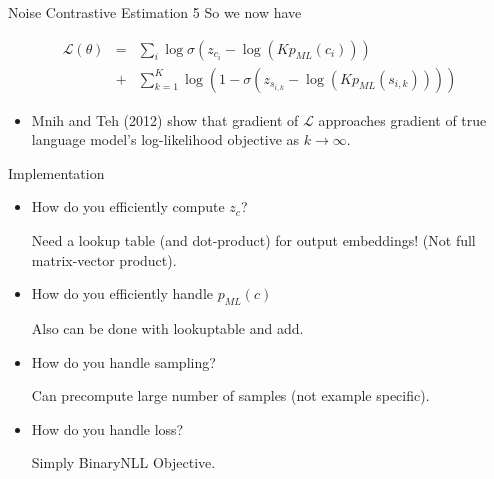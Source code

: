 \documentclass{beamer}
\begin{document}
\begin{frame}{Noise Contrastive Estimation 5}
%
%
So we now have
  
  \begin{eqnarray*}
\mathcal{L}(\theta)
   &=& \sum_{i} \log \sigma(z_{c_i} - \log(K p_{ML}(c_i))) \\
 &+&   \sum_{k=1}^{K} \log (1- \sigma(z_{s_{i,k}} - \log(K p_{ML}(s_{i,k}))))  
 \end{eqnarray*}
 
 \begin{itemize}
 \item Mnih and Teh (2012) show that gradient of $\mathcal{L}$ approaches gradient of true language model's log-likelihood objective as $k \rightarrow \infty$.
 \end{itemize}
\end{frame}

\begin{frame}{Implementation}
  \begin{itemize}
  \item How do you efficiently compute $z_c$?

    Need a lookup table (and dot-product) for output embeddings! (Not full matrix-vector product).

  \item How do you efficiently handle $p_{ML}(c)$
  
    Also can be done with lookuptable and add.

  \item How do you handle sampling?

    Can precompute large number of samples (not example specific).

    \item How do you handle loss?

    Simply BinaryNLL Objective.
  \end{itemize}
\end{frame}
\end{document}
